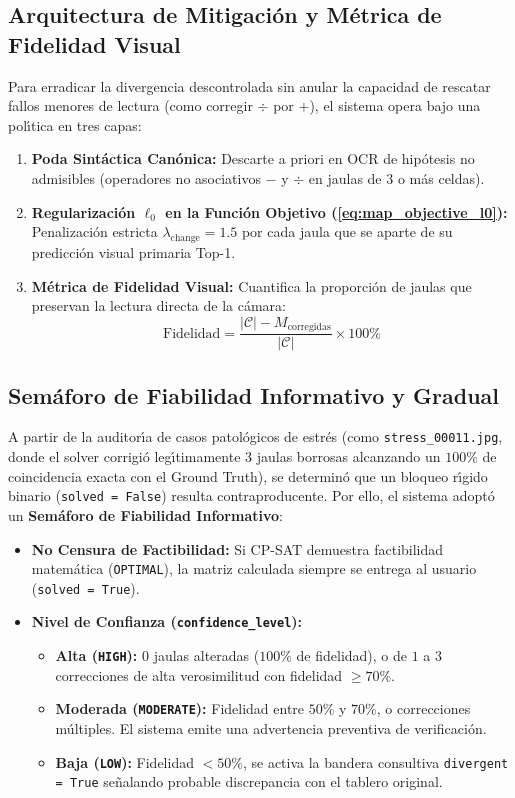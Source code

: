 \subsection{Arquitectura de Mitigaci\'on y M\'etrica de Fidelidad Visual}
Para erradicar la divergencia descontrolada sin anular la capacidad de rescatar fallos menores de lectura (como corregir $\div$ por $+$), el sistema opera bajo una pol\'{\i}tica en tres capas:

\begin{enumerate}
    \item \textbf{Poda Sint\'actica Can\'onica:} Descarte a priori en OCR de hip\'otesis no admisibles (operadores no asociativos $-$ y $\div$ en jaulas de 3 o m\'as celdas).
    \item \textbf{Regularizaci\'on $\ell_0$ en la Funci\'on Objetivo (\ref{eq:map_objective_l0}):} Penalizaci\'on estricta $\lambda_{\text{change}} = 1.5$ por cada jaula que se aparte de su predicci\'on visual primaria Top-1.
    \item \textbf{M\'etrica de Fidelidad Visual:} Cuantifica la proporci\'on de jaulas que preservan la lectura directa de la c\'amara:
    \begin{equation}
        \text{Fidelidad} = \frac{|\mathcal{C}| - M_{\text{corregidas}}}{|\mathcal{C}|} \times 100\%
    \end{equation}
\end{enumerate}

\subsection{Sem\'aforo de Fiabilidad Informativo y Gradual}
A partir de la auditor\'{\i}a de casos patol\'ogicos de estr\'es (como \texttt{stress\_00011.jpg}, donde el solver corrigi\'o leg\'{\i}timamente 3 jaulas borrosas alcanzando un $100\%$ de coincidencia exacta con el Ground Truth), se determin\'o que un bloqueo r\'{\i}gido binario (\texttt{solved = False}) resulta contraproducente. Por ello, el sistema adopt\'o un \textbf{Sem\'aforo de Fiabilidad Informativo}:

\begin{itemize}
    \item \textbf{No Censura de Factibilidad:} Si CP-SAT demuestra factibilidad matem\'atica (\texttt{OPTIMAL}), la matriz calculada siempre se entrega al usuario (\texttt{solved = True}).
    \item \textbf{Nivel de Confianza (\texttt{confidence\_level}):}
    \begin{itemize}
        \item  \textbf{Alta (\texttt{HIGH}):} $0$ jaulas alteradas ($100\%$ de fidelidad), o de $1$ a $3$ correcciones de alta verosimilitud con fidelidad $\ge 70\%$.
        \item  \textbf{Moderada (\texttt{MODERATE}):} Fidelidad entre $50\%$ y $70\%$, o correcciones m\'ultiples. El sistema emite una advertencia preventiva de verificaci\'on.
        \item  \textbf{Baja (\texttt{LOW}):} Fidelidad $< 50\%$, se activa la bandera consultiva \texttt{divergent = True} se\~nalando probable discrepancia con el tablero original.
    \end{itemize}
\end{itemize}
